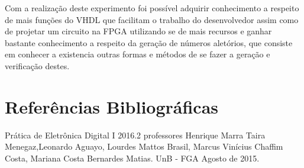 \documentclass[12pts]{article}
\begin{document}
Com a realização deste experimento foi possível adquirir conhecimento a respeito de mais funções do VHDL que facilitam o trabalho do desenvolvedor assim como de projetar um circuito na FPGA utilizando se de mais recursos e ganhar bastante conhecimento a respeito da geração de números aletórios, que consiste em conhecer a existencia outras formas e métodos de se fazer a geração e verificação destes. 

\section{Referências Bibliográficas}
\iffalse
Referencias Bibliográficas, relacionadas e citadas de acordo com as normas da ABNT.
\fi
Prática de Eletrônica Digital I 2016.2 professores Henrique Marra Taira Menegaz,Leonardo Aguayo, Lourdes Mattos Brasil, Marcus Vinícius Chaffim Costa, Mariana Costa Bernardes Matias. UnB - FGA Agosto de 2015.

\iffalse
\section{Diagramas Esquemáticos}
Diagramas Esquemáticos. Todos os diagramas devem ser inseridos ao final do relatório em páginas separadas do texto, indicando a identificação do circuito, autor, revisor, versão e datas relevantes.
\fi
\newpage
\end{document}

